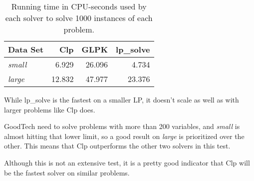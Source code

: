 \begin{table}[ht!]
    \centering
    \caption{Running time in CPU-seconds used by each solver to solve 1000
             instances of each problem.}
    \begin{tabular}{lrrr}
        Data Set       & Clp    & GLPK   & lp\_solve \\ \hline
        \textit{small} & 6.929  & 26.096 & 4.734 \\
        \textit{large} & 12.832 & 47.977 & 23.376
    \end{tabular}
    \label{table:lpres}
\end{table}

While lp\_solve is the fastest on a smaller LP, it doesn't scale as well as
with larger problems like Clp does.

GoodTech need to solve problems with more than 200 variables, and
\textit{small} is almost hitting that lower limit, so a good result on
\textit{large} is prioritized over the other.
This means that Clp outperforms the other two solvers in this test.

Although this is not an extensive test, it is a pretty good indicator that Clp
will be the fastest solver on similar problems.
